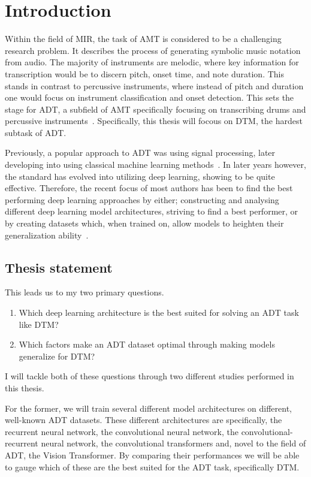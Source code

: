 \chapter{Introduction}

Within the field of \gls{MIR}, the task of \gls{AMT} is considered to be a challenging research problem. It describes the process of generating symbolic music notation from audio. The majority of instruments are melodic, where key information for transcription would be to discern pitch, onset time, and note duration. This stands in contrast to percussive instruments, where instead of pitch and duration one would focus on instrument classification and onset detection. This sets the stage for \gls{ADT}, a subfield of \gls{AMT} specifically focusing on transcribing drums and percussive instruments~\cite{8350302}. Specifically, this thesis will focous on \gls{DTM}, the hardest subtask of \gls{ADT}.

Previously, a popular approach to \gls{ADT} was using signal processing, later developing into using classical machine learning methods~\cite{8350302}. In later years however, the standard has evolved into utilizing deep learning, showing to be quite effective. Therefore, the recent focus of most authors has been to find the best performing deep learning approaches by either; constructing and analysing different deep learning model architectures, striving to find a best performer, or by creating datasets which, when trained on, allow models to heighten their generalization ability~\cite{signals4040042}.

\section{Thesis statement}

This leads us to my two primary questions. 
\begin{enumerate}
    \item Which deep learning architecture is the best suited for solving an \gls{ADT} task like \gls{DTM}?
    \item Which factors make an \gls{ADT} dataset optimal through making models generalize for \gls{DTM}?
\end{enumerate}
I will tackle both of these questions through two different studies performed in this thesis.

For the former, we will train several different model architectures on different, well-known \gls{ADT} datasets. These different architectures are specifically, the recurrent neural network, the convolutional neural network, the convolutional-recurrent neural network, the convolutional transformers and, novel to the field of \gls{ADT}, the Vision Transformer. By comparing their performances we will be able to gauge which of these are the best suited for the \gls{ADT} task, specifically \gls{DTM}. 

